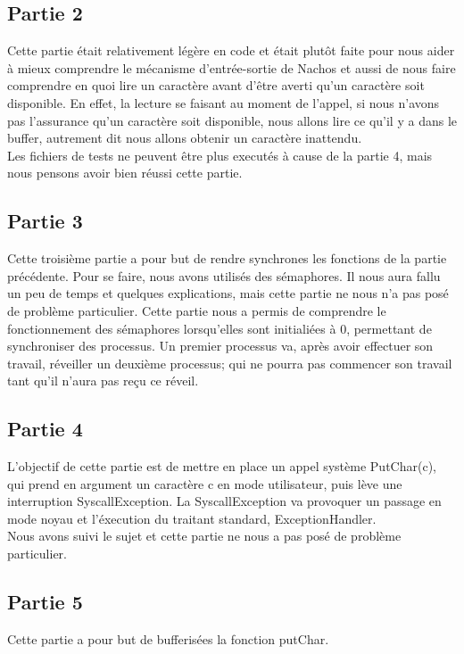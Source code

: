 \documentclass[a4paper]{article}
\begin{document}
\subsection{Partie 2}
Cette partie était relativement légère en code et était plutôt faite pour nous
aider à mieux comprendre le mécanisme d'entrée-sortie de Nachos et aussi de nous
faire comprendre en quoi lire un caractère avant d'être averti qu'un caractère
soit disponible. En effet, la lecture se faisant au moment de l'appel, si nous
n'avons pas l'assurance qu'un caractère soit disponible, nous allons lire ce
qu'il y a dans le buffer, autrement dit nous allons obtenir un caractère inattendu. \\
Les fichiers de tests ne peuvent être plus executés à cause de la partie 4, mais
nous pensons avoir bien réussi cette partie.

\subsection{Partie 3}
Cette troisième partie a pour but de rendre synchrones les fonctions de la partie
précédente. Pour se faire, nous avons utilisés des sémaphores. Il nous aura fallu
un peu de temps et quelques explications, mais cette partie ne nous n'a pas posé
de problème particulier. Cette partie nous a permis de comprendre le fonctionnement
des sémaphores lorsqu'elles sont initialiées à 0, permettant de synchroniser
des processus. Un premier processus va, après avoir effectuer son travail, réveiller
un deuxième processus; qui ne pourra pas commencer son travail tant qu'il n'aura
pas reçu ce réveil.

\subsection{Partie 4}
L'objectif de cette partie est de mettre en place un appel système PutChar(c),
qui prend en argument un caractère c en mode utilisateur, puis lève une interruption
SyscallException. La SyscallException va provoquer un passage en mode noyau et
l'éxecution du traitant standard, ExceptionHandler. \\
Nous avons suivi le sujet et cette partie ne nous a pas posé de problème particulier.

\newpage
\subsection{Partie 5}
Cette partie a pour but de bufferisées la fonction putChar.
\end{document}
